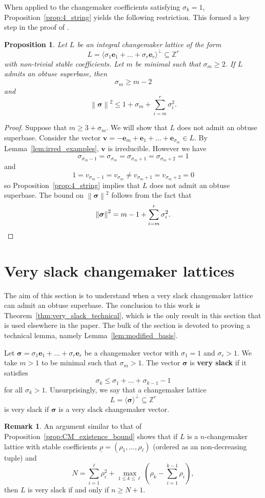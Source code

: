 \documentclass{amsart} %
\newcommand{\Z}{\mathbb{Z}}
\newcommand{\e}{\bm{e}}
\newcommand{\bv}{\bm{v}}
\newcommand{\bsigma}{\bm{\sigma}}
\newcommand{\norm}[1]{\left\lVert #1 \right\rVert^2}
\theoremstyle{thm}
\newtheorem{prop}[Theorem]{Proposition}
\theoremstyle{definition}
\newtheorem{rem}[Theorem]{Remark}
\numberwithin{equation}{section}
\begin{document}
When applied to the changemaker coefficients satisfying $\sigma_k=1$, Proposition~\ref{prop:4_string} yields the following restriction. This formed a key step in the proof of \cite[Theorem~1.2]{Mc17}.
\begin{prop}\label{prop:OSB_m_bound}
Let $L$ be an integral changemaker lattice of the form
\[
L=\langle \sigma_1 \e_1+ \dots+ \sigma_r \e_r\rangle^\bot\subseteq \Z^r
\]
with non-trivial stable coefficients. Let $m$ be minimal such that $\sigma_m\geq 2$. If $L$ admits an obtuse superbase, then
\[
\sigma_m\geq m-2
\]
and
\[\norm{\bsigma}\leq 1+ \sigma_m + \sum_{i=m}^{r}\sigma_i^2.\]
\end{prop}
\begin{proof}

Suppose that $m\geq 3+\sigma_m$. We will show that $L$ does not admit an obtuse superbase. Consider the vector $\bv=-\e_m+\e_1+\dots + \e_{\sigma_m}\in L$. By Lemma~\ref{lem:irred_examples}, $\bv$ is irreducible. However we have 
\[\sigma_{\sigma_m-1}=\sigma_{\sigma_m}=\sigma_{\sigma_m+1}=\sigma_{\sigma_m+2}=1\]
and
\[
1=v_{\sigma_m-1}=v_{\sigma_m}\neq v_{\sigma_m+1}=v_{\sigma_m+2}=0
\]
so Proposition~\ref{prop:4_string} implies that $L$ does not admit an obtuse superbase. The bound on $\norm{\bsigma}$ follows from the fact that
\[
\norm{\bsigma}=m-1+\sum_{i=m}^r \sigma_i^2.\qedhere
\]
\end{proof}

\section{Very slack changemaker lattices}\label{sec:slack_lattices}
The aim of this section is to understand when a very slack changemaker lattice can admit an obtuse superbase. The conclusion to this work is Theorem~\ref{thm:very_slack_technical}, which is the only result in this section that is used elsewhere in the paper. The bulk of the section is devoted to proving a technical lemma, namely Lemma~\ref{lem:modified_basis}.

Let $\bsigma= \sigma_1 \e_1 + \dots + \sigma_r \e_r$ be a changemaker vector with $\sigma_1=1$ and $\sigma_r>1$. We take $m>1$ to be minimal such that $\sigma_m>1$. The vector $\bsigma$ is \textbf{very slack} if it satisfies
\[
\sigma_k \leq \sigma_1 + \dots + \sigma_{k-1} -1
\]
for all $\sigma_k>1$. Unsurprisingly, we say that a changemaker lattice
\[
L=\langle \bsigma \rangle^\bot \subseteq \Z^r
\]
is very slack if $\bsigma$ is a very slack changemaker vector.
\begin{rem}\label{rem:very_slack}
An argument similar to that of Proposition~\ref{prop:CM_existence_bound} shows that if $L$ is a $n$-changemaker lattice with stable coefficients $\underline{\rho}=(\rho_1,\dots, \rho_\ell)$ (ordered as an non-decreasing tuple) and
    \[
N=\sum_{i=1}^\ell \rho_i^2 + \max_{1\leq k \leq \ell} \left(\rho_k - \sum_{i=1}^{k-1} \rho_i \right),
\]
then $L$ is very slack if and only if $n\geq N+1$.
\end{rem}
\end{document}
